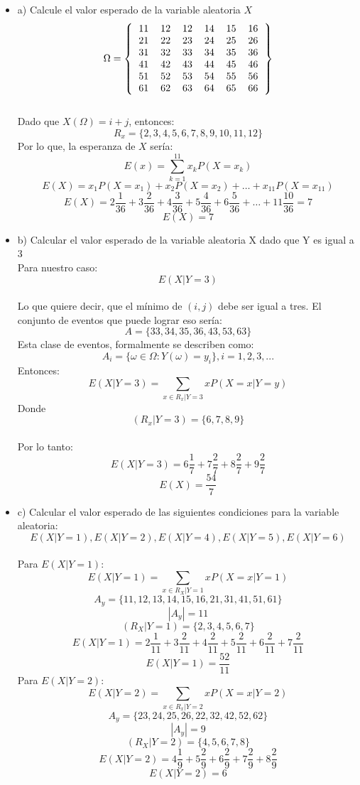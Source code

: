 \documentclass[11pt,fleqn]{book} %
\numberwithin{equation}{section} %
\numberwithin{figure}{section} %
\numberwithin{table}{section} %
\begin{document}
\begin{itemize}
\item a) Calcule el valor esperado de la variable aleatoria $X$
\[
\Omega=\left \{
    \begin{tabular}{cccccc}
    11 & 12 & 12 & 14 & 15 & 16 \\
    21 & 22 & 23 & 24 & 25 & 26 \\
    31 & 32 & 33 & 34 & 35 & 36 \\
    41 & 42 & 43 & 44 & 45 & 46 \\
    51 & 52 & 53 & 54 & 55 & 56 \\
    61 & 62 & 63 & 64 & 65 & 66 
    \end{tabular}
\right \}
\]
\ \\%
Dado que $X(\Omega)=i+j$, entonces: $$R_x=\lbrace2,3,4,5,6,7,8,9,10,11,12\rbrace$$
Por lo que, la esperanza de $X$ sería: 
$$E(x)=\sum_{k=1}^{11}x_kP(X=x_k)$$ $$E(X)=x_1P(X=x_1) + x_2P(X=x_2) + \dots + x_{11}P(X=x_{11})$$
$$E(X)=2\frac{1}{36}+3\frac{2}{36}+4\frac{3}{36}+5\frac{4}{36}+6\frac{5}{36}+\dots+11\frac{10}{36}=7$$ $$E(X)=7$$
\item b) Calcular el valor esperado de la variable aleatoria X dado que Y es igual a 3
\ \\%
Para nuestro caso: $$E(X|Y=3)$$ 
\ \\%
Lo que quiere decir, que el mínimo de $(i,j)$ debe ser igual a tres. El conjunto de eventos que puede lograr eso sería: 
$$A=\lbrace33,34,35,36,43,53,63\rbrace$$ 
Esta clase de eventos, formalmente se describen como:
$$A_{i}=\lbrace \omega\in\Omega: Y(\omega)= y_{i} \rbrace, i=1,2,3,...$$
Entonces:
$$E(X|Y=3)=\sum_{x\in R_x|Y=3}xP(X=x|Y=y)$$
Donde
$$(R_x|Y=3)=\lbrace6,7,8,9\rbrace$$ 
\ \\%
Por lo tanto:
$$E(X|Y=3)=6\frac{1}{7}+7\frac{2}{7}+8\frac{2}{7}+9\frac{2}{7}$$ $$E(X)=\frac{54}{7}$$
\item c) Calcular el valor esperado de las siguientes condiciones para la variable aleatoria:
$$E(X|Y=1), E(X|Y=2), E(X|Y=4), E(X|Y=5), E(X|Y=6)$$ 
\ \\%
Para $E(X|Y=1)$: 
$$E(X|Y=1)=\sum_{x\in R_X|Y=1}xP(X=x|Y=1)$$ 
$$A_{y}=\lbrace 11,12,13,14,15,16,21,31,41,51,61\rbrace$$ $$|A_{y}|=11$$ $$(R_X|Y=1)=\lbrace 2,3,4,5,6,7\rbrace$$ $$E(X|Y=1)=2\frac{1}{11}+3\frac{2}{11}+4\frac{2}{11}+5\frac{2}{11}+6\frac{2}{11}+7\frac{2}{11}$$
$$E(X|Y=1)=\frac{52}{11}$$
Para $E(X|Y=2)$: 
$$E(X|Y=2)=\sum_{x\in R_x|Y=2}xP(X=x|Y=2)$$ $$A_y=\lbrace 23,24,25,26,22,32,42,52,62\rbrace$$ $$|A_y|=9$$ $$(R_X|Y=2)=\lbrace 4,5,6,7,8\rbrace$$ $$E(X|Y=2)=4\frac{1}{9}+5\frac{2}{9}+6\frac{2}{9}+7\frac{2}{9}+8\frac{2}{9}$$ $$E(X|Y=2)=6$$

\end{itemize}
\end{document}
